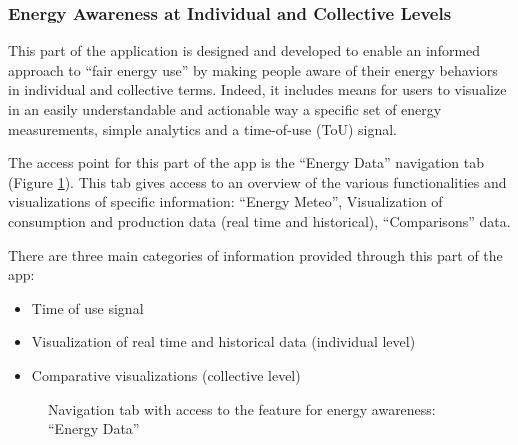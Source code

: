 \subsubsection{Energy Awareness at Individual and Collective Levels}\label{sec:energydata}

This part of the application is designed and developed to enable an informed approach to ``fair energy use'' by making people aware of their
energy behaviors in individual and collective terms. Indeed, it includes means for users to visualize in an easily
understandable and actionable way a specific set of energy measurements, simple analytics and a time-of-use (ToU) signal.

The access point for this part of the app is the ``Energy Data'' navigation tab (Figure \ref{fig:tab}). This tab gives access to an
overview of the various functionalities and visualizations of specific information: ``Energy Meteo'', Visualization of consumption and production data (real time and historical),
``Comparisons'' data.

There are three main categories of information provided through this part of the app:
\begin{itemize}
 \item Time of use signal
 \item Visualization of real time and historical data (individual level)
 \item Comparative visualizations (collective level)
\end{itemize}

\begin{figure}[htb]
\centering
{}
\caption{Navigation tab with access to the feature for energy awareness: ``Energy Data''}\label{fig:tab}
\end{figure}

